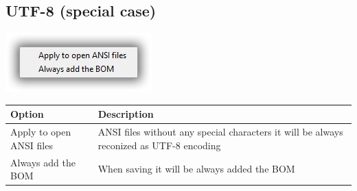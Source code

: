 \hypertarget{menu_format_utf8}{}
\subsection{UTF-8 (special case)}

\includegraphics[scale=0.50]{./res/menu_format_utf8.png}\\

\begin{scriptsize}\begin{tabularx}{\textwidth}{>{\hsize=0.4\hsize}X>{\hsize=0.6\hsize}X}\\
    \hline
    \textbf{Option} & \textbf{Description} \\
    \hline
    Apply to open ANSI files & ANSI files without any special characters it will be always reconized as UTF-8 encoding \\
    Always add the BOM & When saving it will be always added the BOM \\
    \hline
  \end{tabularx}\end{scriptsize}
